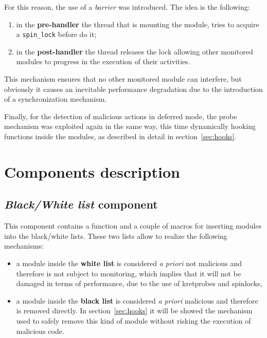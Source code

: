 \documentclass{article}
\begin{document}
	For this reason, the use of a \textit{barrier} was introduced. The idea is the following:
	\begin{enumerate}
		\item in the \textbf{pre-handler} the thread that is mounting the module, tries to acquire a \texttt{spin\_lock}
		before do it;
		\item in the \textbf{post-handler} the thread releases the lock allowing other monitored modules to progress in
		the execution of their activities.
	\end{enumerate}

	This mechanism ensures that no other monitored module can interfere, but obviously it causes an inevitable
	performance degradation due to the introduction of a synchronization mechanism.

	Finally, for the detection of malicious actions in deferred mode, the probe mechanism was exploited again in the
	same way, this time dynamically hooking functions inside the modules, as described in detail in
	section~\ref{sec:hooks}.

	\section{Components description}

	\subsection{\emph{Black/White list} component}\label{sec:bwlist}
	This component contains a function and a couple of macros for inserting modules into the black/white lists.
	These two lists allow to realize the following mechanisms:
	\begin{itemize}
		\item a module inside the \textbf{white list} is considered \textit{a priori} not malicious and therefore
		is not subject to monitoring, which implies that it will not be damaged in terms of performance, due to the use
		of kretprobes and spinlocks,
		\item a module inside the \textbf{black list} is considered \textit{a priori} malicious and therefore is
		removed directly. In section~\ref{sec:hooks} it will be showed the mechanism used to safely remove this kind of
		module without risking the execution of malicious code.
	\end{itemize}
\end{document}
